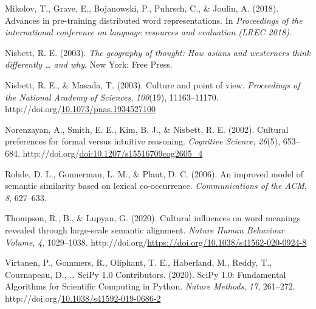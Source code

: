 \documentclass[10pt, letterpaper]{article}
\newenvironment{CSLReferences}%
  {}%
  {\par}
\begin{document}
\begin{CSLReferences}{1}{0}
\leavevmode{}%
Mikolov, T., Grave, E., Bojanowski, P., Puhrsch, C., \& Joulin, A.
(2018). Advances in pre-training distributed word representations. In
\emph{Proceedings of the international conference on language resources
and evaluation (LREC 2018)}.

\leavevmode{}%
Nisbett, R. E. (2003). \emph{The geography of thought: How asians and
westerners think differently \ldots{} and why}. New York: Free Press.

\leavevmode{}%
Nisbett, R. E., \& Masada, T. (2003). Culture and point of view.
\emph{Proceedings of the National Academy of Sciences}, \emph{100}(19),
11163--11170.
http://doi.org/\href{https://doi.org/10.1073/pnas.1934527100}{10.1073/pnas.1934527100}

\leavevmode{}%
Norenzayan, A., Smith, E. E., Kim, B. J., \& Nisbett, R. E. (2002).
Cultural preferences for formal versus intuitive reasoning.
\emph{Cognitive Science}, \emph{26}(5), 653--684.
http://doi.org/\href{https://doi.org/doi:10.1207/s15516709cog2605_4}{doi:10.1207/s15516709cog2605\_4}

\leavevmode{}%
Rohde, D. L., Gonnerman, L. M., \& Plaut, D. C. (2006). An improved
model of semantic similarity based on lexical co‐occurrence.
\emph{Communications of the ACM}, \emph{8}, 627--633.

\leavevmode{}%
Thompson, R., B., \& Lupyan, G. (2020). Cultural influences on word
meanings revealed through large-scale semantic alignment. \emph{Nature
Human Behaviour Volume}, \emph{4}, 1029--1038.
http://doi.org/\url{https://doi.org/10.1038/s41562-020-0924-8}

\leavevmode{}%
Virtanen, P., Gommers, R., Oliphant, T. E., Haberland, M., Reddy, T.,
Cournapeau, D., \ldots{} SciPy 1.0 Contributors. (2020). {{SciPy} 1.0:
Fundamental Algorithms for Scientific Computing in Python}. \emph{Nature
Methods}, \emph{17}, 261--272.
http://doi.org/\href{https://doi.org/10.1038/s41592-019-0686-2}{10.1038/s41592-019-0686-2}

\end{CSLReferences}


\end{document}
